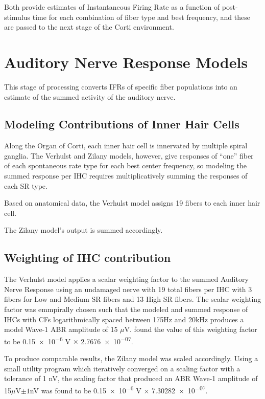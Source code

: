 Both provide estimates of Instantaneous Firing Rate as a function of post-stimulus time for each combination of fiber type and best frequency, and these are passed to the next stage of the Corti environment.


\section{Auditory Nerve Response Models} %
\label{sec:auditory_nerve_response_models}
This stage of processing converts IFRs of specific fiber populations into an estimate of the summed activity of the auditory nerve. 

\subsection{Modeling Contributions of Inner Hair Cells} %
\label{sub:contributions_to_the_response_by_inner_hair_cells}
Along the Organ of Corti, each inner hair cell is innervated by multiple spiral ganglia.  The Verhulst and Zilany models, however, give responses of ``one'' fiber of each spontaneous rate type for each best center frequency, so modeling the summed response per IHC requires multiplicatively summing the responses of each SR type. 

Based on anatomical data, the Verhulst model assigns 19 fibers to each inner hair cell.  

The Zilany model's output is summed accordingly. 
\subsection{Weighting of IHC contribution} %
\label{sub:weighting_of_ihc_contribution}
The Verhulst model applies a scalar weighting factor to the summed Auditory Nerve Response using an undamaged nerve with 19 total fibers per IHC with 3 fibers for Low and Medium SR fibers and 13 High SR fibers. The scalar weighting factor was emmpirally chosen such that the modeled and summed response of IHCs with CFs logarithmically spaced between 175Hz and 20kHz produces a model Wave-1 ABR amplitude of 15 $\mu$V.  \citeauthor{Verhulst2015Functional} found the value of this weighting factor to be \num{0.15e-6} V $\times$ \num{2.7676e-07}.

To produce comparable results, the Zilany model was scaled accordingly. Using a small utility program which iteratively converged on a scaling factor with a tolerance of 1 nV, the scaling factor that produced an ABR Wave-1 amplitude of 15$\mu$V$\pm 1$nV was found to be \num{0.15e-6} V $\times$ \num{7.30282e-07}.


